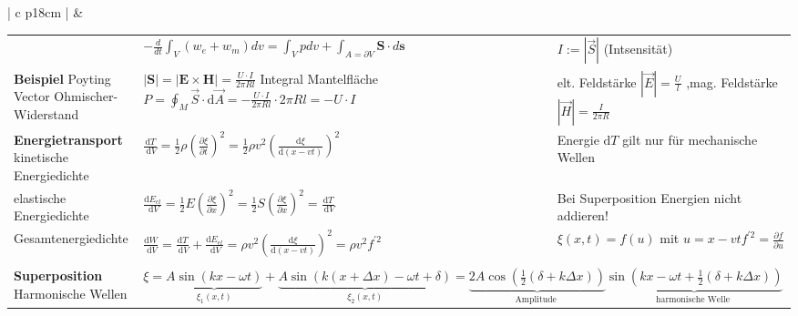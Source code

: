 \begin{tabular}{ | c   p{18cm} |}
		\hline
		\rotcell{\large\textbf{\textcolor{white}{Wellen}}}  &
		\setlength{\extrarowheight}{10pt}			
		\begin{tabular}{L{5cm} L{7cm} L{5cm}}

				
				&$\displaystyle -\frac{d}{d t} \int_{V}\left(w_{e}+w_{m}\right) d v=\int_{V} p d v+\int_{A=\partial V} \mathbf{S} \cdot d \mathbf{s}$&  $I:=|\vec{S}|$ (Intsensität) \\[10pt]
				
				\textbf{Beispiel}  Poyting Vector Ohmischer-Widerstand   &$\displaystyle|\mathbf{S}|=|\mathbf{E} \times \mathbf{H}|=\frac{U \cdot I}{2 \pi R l}$ Integral Mantelfläche
				$\displaystyle P=\oint_{M} \vec{S} \cdot \mathrm{d} \vec{A}=-\frac{U \cdot I}{2 \pi R l} \cdot 2 \pi R l=-U \cdot I$  & elt. Feldstärke $\displaystyle |\vec{E}|=\frac{U}{l}$ ,\qquad mag. Feldstärke$|\displaystyle\vec{H}|=\frac{I}{2 \pi R}$ \\[20pt]

			
			\textbf{Energietransport} \qquad kinetische Energiedichte   & $\displaystyle \frac{\mathrm{d} T}{\mathrm{~d} V}=\frac{1}{2} \rho\left(\frac{\partial \xi}{\partial t}\right)^{2}=\frac{1}{2} \rho v^{2}\left(\frac{\mathrm{d} \xi}{\mathrm{d}(x-v t)}\right)^{2}$& Energie $\mathrm{d} T$ \qquad gilt nur für mechanische Wellen
			\\
			elastische Energiedichte & $\displaystyle \frac{\mathrm{d} E_{e l}}{\mathrm{~d} V}=\frac{1}{2} E\left(\frac{\partial \xi}{\partial x}\right)^{2}=\frac{1}{2} S\left(\frac{\partial \xi}{\partial x}\right)^{2}=\frac{\mathrm{d} T}{\mathrm{~d} V}$& Bei Superposition Energien nicht addieren!\\[5pt]
				
			Gesamtenergiedichte &$\displaystyle \frac{\mathrm{d} W}{\mathrm{~d} V}=\frac{\mathrm{d} T}{\mathrm{~d} V}+\frac{\mathrm{d} E_{e l}}{\mathrm{~d} V}=\rho v^{2}\left(\frac{\mathrm{d} \xi}{\mathrm{d}(x-v t)}\right)^{2}=\rho v^{2} f^{\prime 2}$& $\xi(x, t)=f(u)$ mit  $u=x-v t$\qquad $\displaystyle f^{\prime 2}=\frac{\partial f}{\partial u}$ \\	[20pt]
			
			
			&&\\[-15pt]
			\textbf{Superposition} \qquad \qquad Harmonische Wellen &
			 \\[10pt]
			

\end{tabular}
\end{tabular}
